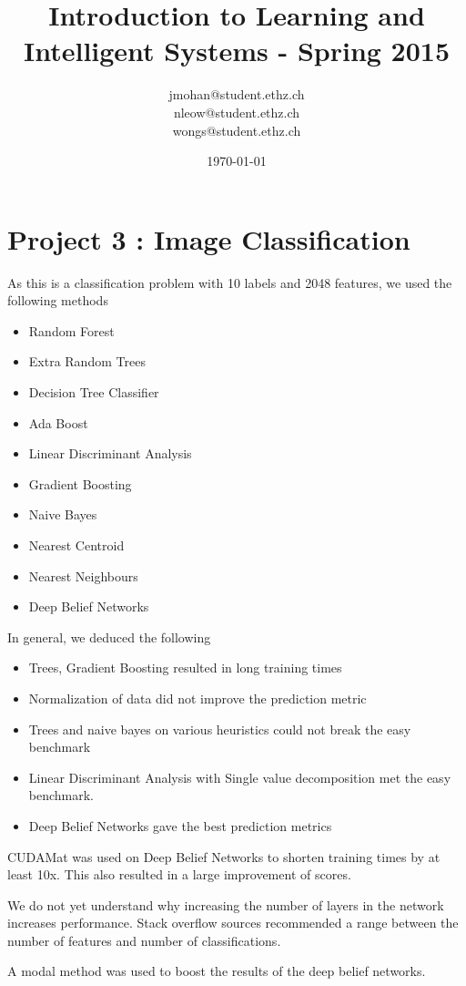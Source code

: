 \documentclass[a4paper, 11pt]{article}
\title{Introduction to Learning and Intelligent Systems - Spring 2015}
\author{jmohan@student.ethz.ch\\ nleow@student.ethz.ch\\ wongs@student.ethz.ch\\}
\date{\today}
\begin{document}
\maketitle

\section*{Project 3 : Image Classification}

As this is a classification problem with 10 labels and 2048 features, we used the following methods

\begin{itemize}
  \item Random Forest
  \item Extra Random Trees
  \item Decision Tree Classifier
  \item Ada Boost
  \item Linear Discriminant Analysis
  \item Gradient Boosting
  \item Naive Bayes
  \item Nearest Centroid
  \item Nearest Neighbours
  \item Deep Belief Networks
\end{itemize}

In general, we deduced the following
\begin{itemize}
  \item Trees, Gradient Boosting resulted in long training times
  \item Normalization of data did not improve the prediction metric
  \item Trees and naive bayes on various heuristics could not break the easy benchmark
  \item Linear Discriminant Analysis with Single value decomposition met the easy benchmark.
  \item Deep Belief Networks gave the best prediction metrics
\end{itemize}

CUDAMat was used on Deep Belief Networks to shorten training times by at least 10x. This also resulted in a large improvement of scores.

We do not yet understand why increasing the number of layers in the network increases performance. Stack overflow sources recommended a range between the number of features and number of classifications.

A modal method was used to boost the results of the deep belief networks.
\end{document}
